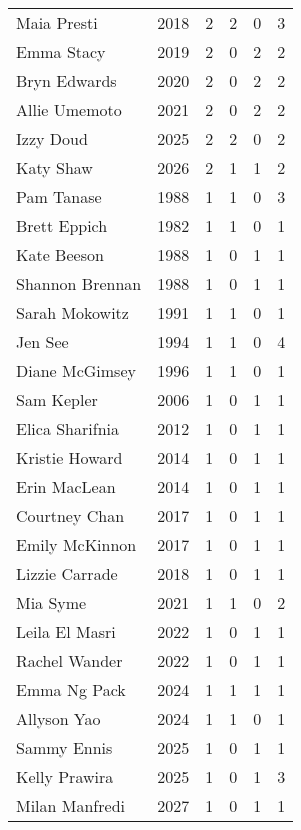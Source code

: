 \begin{longtable}{lccccc}
Maia Presti & 2018 & 2 & 2 & 0 & 3 \\
Emma Stacy & 2019 & 2 & 0 & 2 & 2 \\
Bryn Edwards & 2020 & 2 & 0 & 2 & 2 \\
Allie Umemoto & 2021 & 2 & 0 & 2 & 2 \\
Izzy Doud & 2025 & 2 & 2 & 0 & 2 \\
Katy Shaw & 2026 & 2 & 1 & 1 & 2 \\
Pam Tanase & 1988 & 1 & 1 & 0 & 3 \\
Brett Eppich & 1982 & 1 & 1 & 0 & 1 \\
Kate Beeson & 1988 & 1 & 0 & 1 & 1 \\
Shannon Brennan & 1988 & 1 & 0 & 1 & 1 \\
Sarah Mokowitz & 1991 & 1 & 1 & 0 & 1 \\
Jen See & 1994 & 1 & 1 & 0 & 4 \\
Diane McGimsey & 1996 & 1 & 1 & 0 & 1 \\
Sam Kepler & 2006 & 1 & 0 & 1 & 1 \\
Elica Sharifnia & 2012 & 1 & 0 & 1 & 1 \\
Kristie Howard & 2014 & 1 & 0 & 1 & 1 \\
Erin MacLean & 2014 & 1 & 0 & 1 & 1 \\
Courtney Chan & 2017 & 1 & 0 & 1 & 1 \\
Emily McKinnon & 2017 & 1 & 0 & 1 & 1 \\
Lizzie Carrade & 2018 & 1 & 0 & 1 & 1 \\
Mia Syme & 2021 & 1 & 1 & 0 & 2 \\
Leila El Masri & 2022 & 1 & 0 & 1 & 1 \\
Rachel Wander & 2022 & 1 & 0 & 1 & 1 \\
Emma Ng Pack & 2024 & 1 & 1 & 1 & 1 \\
Allyson Yao & 2024 & 1 & 1 & 0 & 1 \\
Sammy Ennis & 2025 & 1 & 0 & 1 & 1 \\
Kelly Prawira & 2025 & 1 & 0 & 1 & 3 \\
Milan Manfredi & 2027 & 1 & 0 & 1 & 1 \\
\end{longtable}


